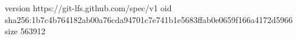 version https://git-lfs.github.com/spec/v1
oid sha256:1b7c4b764182ab00a76cda94701c7e741b1e5683ffab0e0659f166a4172d5966
size 563912
